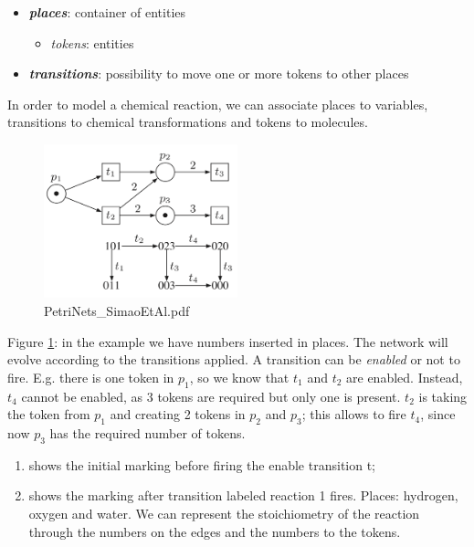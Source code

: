   \begin{itemize}
    \item \textbf{\emph{places}}: container of entities
      \begin{itemize}
        \item \emph{tokens}: entities
      \end{itemize}
    \item \textbf{\emph{transitions}}: possibility to move one or more tokens to other places
  \end{itemize}

\noindent
  In order to model a chemical reaction, we can associate places to variables, transitions to chemical transformations and tokens to molecules.
  \\

  \begin{figure}[h!]
    \centering
    \includegraphics[width=0.5\textwidth]{petri_nets.png}
    \caption{PetriNets\_SimaoEtAl.pdf}
    \label{fig:petri}
  \end{figure}

\noindent
  Figure \ref{fig:petri}: in the example we have numbers inserted in places.
  The network will evolve according to the transitions applied.
  A transition can be \emph{enabled} or not to fire.
  E.g. there is one token in \(p_1\), so we know that \(t_1\) and \(t_2\) are enabled.
  Instead, \(t_4\) cannot be enabled, as 3 tokens are required but only one is present.
  \(t_2\) is taking the token from \(p_1\) and creating 2 tokens in \(p_2\) and \(p_3\); this allows to fire \(t_4\), since now \(p_3\) has the required number of tokens.

  \begin{enumerate}
    \def\labelenumi{(\alph{enumi})}
    \item shows the initial marking before firing the enable transition t; 
    \item shows the marking after transition labeled reaction 1 fires.
      Places: hydrogen, oxygen and water.
      We can represent the stoichiometry of the reaction through the numbers on the edges and the numbers to the tokens.
    \end{enumerate}

